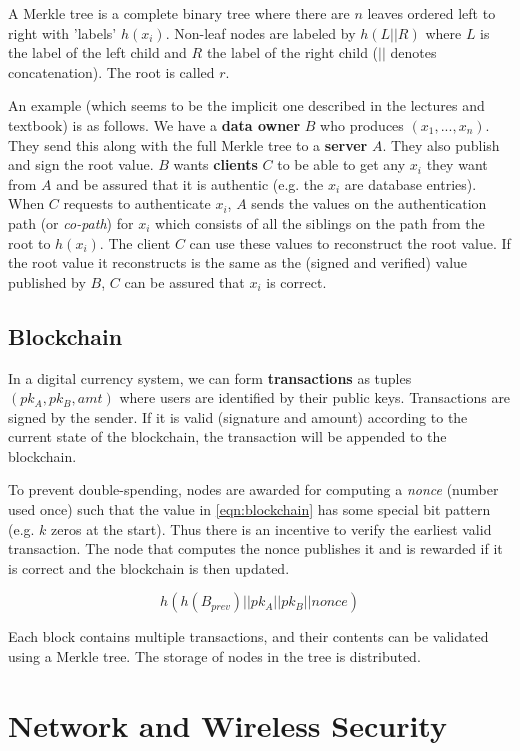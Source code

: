 \documentclass[11pt]{report}
\begin{document}
A Merkle tree is a complete binary tree where there are $n$ leaves ordered left to right with 'labels' $h(x_i)$. Non-leaf nodes are labeled by $h(L || R)$ where $L$ is the label of the left child and $R$ the label of the right child ($||$ denotes concatenation). The root is called $r$.

An example (which seems to be the implicit one described in the lectures and textbook) is as follows. We have a \textbf{data owner} $B$ who produces $(x_1, ..., x_n)$. They send this along with the full Merkle tree to a \textbf{server} $A$. They also publish and sign the root value. $B$ wants \textbf{clients} $C$ to be able to get any $x_i$ they want from $A$ and be assured that it is authentic (e.g. the $x_i$ are database entries). When $C$ requests to authenticate $x_i$, $A$ sends the values on the authentication path (or \textit{co-path}) for $x_i$ which consists of all the siblings on the path from the root to $h(x_i)$. The client $C$ can use these values to reconstruct the root value. If the root value it reconstructs is the same as the (signed and verified) value published by $B$, $C$ can be assured that $x_i$ is correct.

\section{Blockchain}
In a digital currency system, we can form \textbf{transactions} as tuples $(pk_A, pk_B, amt)$ where users are identified by their public keys. Transactions are signed by the sender. If it is valid (signature and amount) according to the current state of the blockchain, the transaction will be appended to the blockchain.

To prevent double-spending, nodes are awarded for computing a \textit{nonce} (number used once) such that the value in \autoref{eqn:blockchain} has some special bit pattern (e.g. $k$ zeros at the start). Thus there is an incentive to verify the earliest valid transaction. The node that computes the nonce publishes it and is rewarded if it is correct and the blockchain is then updated.

\begin{equation}
	\label{eqn:blockchain}
	h(h(B_{prev})||pk_A||pk_B||nonce)
\end{equation}

Each block contains multiple transactions, and their contents can be validated using a Merkle tree. The storage of nodes in the tree is distributed.


\chapter{Network and Wireless Security}\label{sec:topic-3}
\end{document}

